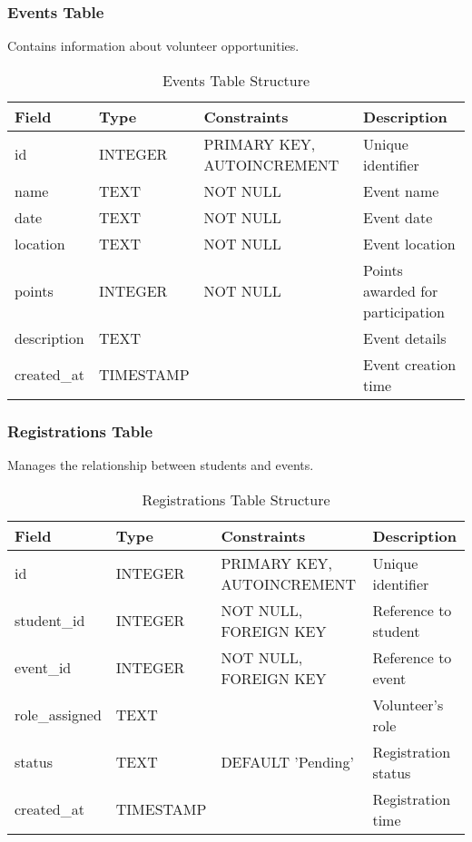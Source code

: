 \documentclass[12pt,a4paper]{report}
\begin{document}
\subsubsection{Events Table}
Contains information about volunteer opportunities.

\begin{table}[H]
    \centering
    \begin{tabular}{|l|l|l|p{4cm}|}
        \hline
        \textbf{Field} & \textbf{Type} & \textbf{Constraints} & \textbf{Description} \\
        \hline
        id & INTEGER & PRIMARY KEY, AUTOINCREMENT & Unique identifier \\
        \hline
        name & TEXT & NOT NULL & Event name \\
        \hline
        date & TEXT & NOT NULL & Event date \\
        \hline
        location & TEXT & NOT NULL & Event location \\
        \hline
        points & INTEGER & NOT NULL & Points awarded for participation \\
        \hline
        description & TEXT & & Event details \\
        \hline
        created\_at & TIMESTAMP & & Event creation time \\
        \hline
    \end{tabular}
    \caption{Events Table Structure}
    \label{tab:events}
\end{table}

\subsubsection{Registrations Table}
Manages the relationship between students and events.

\begin{table}[H]
    \centering
    \begin{tabular}{|l|l|l|p{4cm}|}
        \hline
        \textbf{Field} & \textbf{Type} & \textbf{Constraints} & \textbf{Description} \\
        \hline
        id & INTEGER & PRIMARY KEY, AUTOINCREMENT & Unique identifier \\
        \hline
        student\_id & INTEGER & NOT NULL, FOREIGN KEY & Reference to student \\
        \hline
        event\_id & INTEGER & NOT NULL, FOREIGN KEY & Reference to event \\
        \hline
        role\_assigned & TEXT & & Volunteer's role \\
        \hline
        status & TEXT & DEFAULT 'Pending' & Registration status \\
        \hline
        created\_at & TIMESTAMP & & Registration time \\
        \hline
    \end{tabular}
    \caption{Registrations Table Structure}
    \label{tab:registrations}
\end{table}
\end{document}

